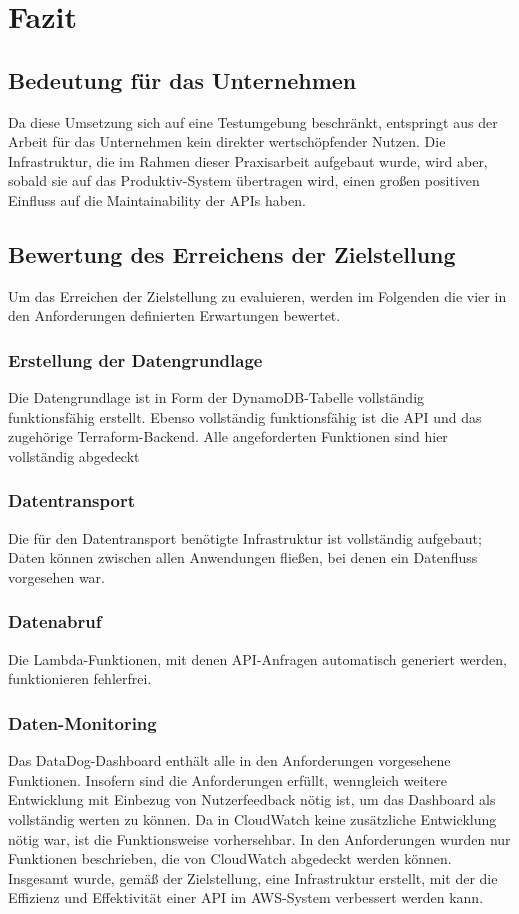 \section{Fazit} 
\subsection{Bedeutung für das Unternehmen}
Da diese Umsetzung sich auf eine Testumgebung beschränkt, entspringt aus der Arbeit für das Unternehmen kein direkter wertschöpfender Nutzen. Die Infrastruktur, die im Rahmen dieser Praxisarbeit aufgebaut wurde, wird aber, sobald sie auf das Produktiv-System übertragen wird, einen großen positiven Einfluss auf die Maintainability der APIs haben. 
\subsection{Bewertung des Erreichens der Zielstellung}
Um das Erreichen der Zielstellung zu evaluieren, werden im Folgenden die vier in den Anforderungen definierten Erwartungen bewertet.
\subsubsection{Erstellung der Datengrundlage}
Die Datengrundlage ist in Form der DynamoDB-Tabelle vollständig funktionsfähig erstellt. Ebenso vollständig funktionsfähig ist die API und das zugehörige Terraform-Backend. Alle angeforderten Funktionen sind hier vollständig abgedeckt
\subsubsection{Datentransport}
Die für den Datentransport benötigte Infrastruktur ist vollständig aufgebaut; Daten können zwischen allen Anwendungen fließen, bei denen ein Datenfluss vorgesehen war. 
\subsubsection{Datenabruf}
Die Lambda-Funktionen, mit denen API-Anfragen automatisch generiert werden, funktionieren fehlerfrei. 
\subsubsection{Daten-Monitoring}
Das DataDog-Dashboard enthält alle in den Anforderungen vorgesehene Funktionen. Insofern sind die Anforderungen erfüllt, wenngleich weitere Entwicklung mit Einbezug von Nutzerfeedback nötig ist, um das Dashboard als vollständig werten zu können.\newline
Da in CloudWatch keine zusätzliche Entwicklung nötig war, ist die Funktionsweise vorhersehbar. In den Anforderungen wurden nur Funktionen beschrieben, die von CloudWatch abgedeckt werden können.
\newline
Insgesamt wurde, gemäß der Zielstellung, eine Infrastruktur erstellt, mit der die Effizienz und Effektivität einer API im AWS-System verbessert werden kann.
